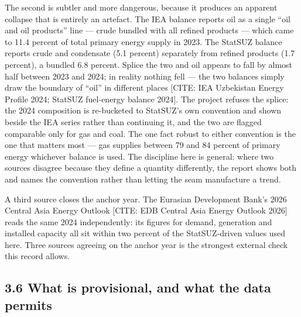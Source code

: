 \documentclass[10pt,twocolumn]{article}
\newcommand{\mk}[1]{{\color{amber}\small #1}}
\begin{document}
The second is subtler and more dangerous, because it produces an apparent collapse that is entirely an artefact. The IEA balance reports oil as a single ``oil and oil products'' line --- crude bundled with all refined products --- which came to 11.4 percent of total primary energy supply in 2023. The StatSUZ balance reports crude and condensate (5.1 percent) separately from refined products (1.7 percent), a bundled 6.8 percent. Splice the two and oil appears to fall by almost half between 2023 and 2024; in reality nothing fell --- the two balances simply draw the boundary of ``oil'' in different places \mk{[CITE: IEA Uzbekistan Energy Profile 2024; StatSUZ fuel-energy balance 2024]}. The project refuses the splice: the 2024 composition is re-bucketed to StatSUZ's own convention and shown beside the IEA series rather than continuing it, and the two are flagged comparable only for gas and coal. The one fact robust to either convention is the one that matters most --- gas supplies between 79 and 84 percent of primary energy whichever balance is used. The discipline here is general: where two sources disagree because they define a quantity differently, the report shows both and names the convention rather than letting the seam manufacture a trend.

A third source closes the anchor year. The Eurasian Development Bank's 2026 Central Asia Energy Outlook \mk{[CITE: EDB Central Asia Energy Outlook 2026]} reads the same 2024 independently: its figures for demand, generation and installed capacity all sit within two percent of the StatSUZ-driven values used here. Three sources agreeing on the anchor year is the strongest external check this record allows.

\subsection*{3.6 What is provisional, and what the data permits}
\end{document}
